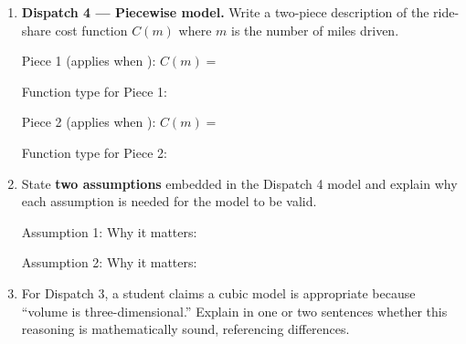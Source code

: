 \documentclass[10pt]{article}
\begin{document}
\begin{tcolorbox}[colback=white, colframe=black!40,
    title=\textbf{Tier E --- Extend},
    fonttitle=\bfseries, arc=2mm, left=3mm, right=3mm, top=2mm, bottom=2mm]

\begin{enumerate}[itemsep=10pt]

  \item \textbf{Dispatch 4 --- Piecewise model.} Write a two-piece description of the ride-share
        cost function $C(m)$ where $m$ is the number of miles driven.

        \medskip
        Piece 1 (applies when \blank{3cm}): $C(m) = $ \blank{5cm}

        \vspace{0.05in}
        Function type for Piece 1: \blank{3.5cm}

        \medskip
        Piece 2 (applies when \blank{3cm}): $C(m) = $ \blank{5cm}

        \vspace{0.05in}
        Function type for Piece 2: \blank{3.5cm}

  \item State \textbf{two assumptions} embedded in the Dispatch 4 model and explain
        why each assumption is needed for the model to be valid.

        \medskip
        Assumption 1: \writeline
        Why it matters: \writeline

        \medskip
        Assumption 2: \writeline
        Why it matters: \writeline

  \item For Dispatch 3, a student claims a cubic model is appropriate because ``volume is
        three-dimensional.'' Explain in one or two sentences whether this reasoning is
        mathematically sound, referencing differences.

        \medskip

\end{enumerate}
\end{tcolorbox}
\end{document}
